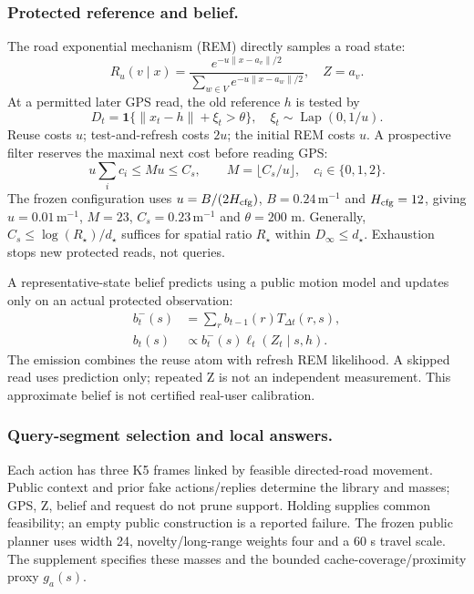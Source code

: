 \subsubsection{Protected reference and belief.}
The road exponential mechanism (REM) directly samples a road state:
\begin{equation}
R_u(v\mid x)=
\frac{e^{-u\|x-a_v\|/2}}{\sum_{w\in V}e^{-u\|x-a_w\|/2}},
\quad Z=a_v. \label{eq:rem}
\end{equation}
At a permitted later GPS read, the old reference $h$ is tested by
\begin{equation}
D_t=\mathbf1\{\|x_t-h\|+\xi_t>\theta\},
\quad \xi_t\sim\operatorname{Lap}(0,1/u). \label{eq:test}
\end{equation}
Reuse costs $u$; test-and-refresh costs $2u$; the initial REM costs $u$.
A prospective filter reserves the maximal next cost before reading GPS:
\begin{equation}
u\sum_i c_i\le Mu\le C_s,\qquad
M=\lfloor C_s/u\rfloor,\quad c_i\in\{0,1,2\}. \label{eq:cap}
\end{equation}
The frozen configuration uses $u=B/(2H_{\rm cfg})$,
$B=0.24\,\mathrm m^{-1}$ and $H_{\rm cfg}=12$, giving $u=0.01\,\mathrm m^{-1}$,
$M=23$, $C_s=0.23\,\mathrm m^{-1}$ and $\theta=200$ m.
Generally, $C_s\le\log(R_\star)/d_\star$ suffices for spatial ratio $R_\star$
within $D_\infty\le d_\star$. Exhaustion stops new protected reads, not queries.

A representative-state belief predicts using a public motion model and updates
only on an actual protected observation:
\begin{align}
b_t^-(s)&=\sum_r b_{t-1}(r)T_{\Delta t}(r,s),\\
b_t(s)&\propto b_t^-(s)\ell_t(Z_t\mid s,h). \label{eq:belief}
\end{align}
The emission combines the reuse atom with refresh REM likelihood.
A skipped read uses prediction only; repeated Z is not an independent
measurement. This approximate belief is not certified real-user calibration.

\subsubsection{Query-segment selection and local answers.}
Each action has three K5 frames linked by feasible directed-road movement.
Public context and prior fake actions/replies determine the library and masses;
GPS, Z, belief and request do not prune support. Holding supplies common
feasibility; an empty public construction is a reported failure.
The frozen public planner uses width 24, novelty/long-range weights four and
a 60 s travel scale. The supplement specifies these masses and the bounded
cache-coverage/proximity proxy $g_a(s)$.

